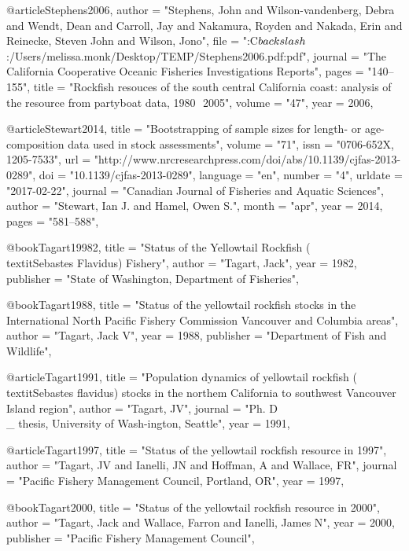 @article{Stephens2006,
    author = "{Stephens, John and Wilson-vandenberg, Debra and Wendt, Dean and Carroll, Jay and Nakamura, Royden and Nakada, Erin and Reinecke, Steven John and Wilson, Jono}",
    file = "{:C$\\backslash$:/Users/melissa.monk/Desktop/TEMP/Stephens2006.pdf:pdf}",
    journal = "{The California Cooperative Oceanic Fisheries Investigations Reports}",
    pages = "{140--155}",
    title = "{{Rockfish resouces of the south central California coast: analysis of the resource from partyboat data, 1980  2005}}",
    volume = "{47}",
    year = 2006,
}

@article{Stewart2014,
    title = "{Bootstrapping of sample sizes for length- or age-composition data used in stock assessments}",
    volume = "{71}",
    issn = "{0706-652X, 1205-7533}",
    url = "{http://www.nrcresearchpress.com/doi/abs/10.1139/cjfas-2013-0289}",
    doi = "{10.1139/cjfas-2013-0289}",
    language = "{en}",
    number = "{4}",
    urldate = "{2017-02-22}",
    journal = "{Canadian Journal of Fisheries and Aquatic Sciences}",
    author = "{Stewart, Ian J. and Hamel, Owen S.}",
    month = "apr",
    year = 2014,
    pages = "{581--588}",
}

@book{Tagart19982,
    title = "{Status of the Yellowtail Rockfish (\\textit{{Sebastes} Flavidus}) Fishery}",
    author = "{Tagart, Jack}",
    year = 1982,
    publisher = "{State of Washington, Department of Fisheries}",
}

@book{Tagart1988,
    title = "{Status of the yellowtail rockfish stocks in the International North Pacific Fishery Commission Vancouver and Columbia areas}",
    author = "{Tagart, Jack V}",
    year = 1988,
    publisher = "{Department of Fish and Wildlife}",
}

@article{Tagart1991,
    title = "{Population dynamics of yellowtail rockfish (\\textit{{Sebastes} flavidus}) stocks in the northem California to southwest Vancouver Island region}",
    author = "{Tagart, JV}",
    journal = "{Ph. D\\_ thesis, University of Wash-ington, Seattle}",
    year = 1991,
}

@article{Tagart1997,
    title = "{Status of the yellowtail rockfish resource in 1997}",
    author = "{Tagart, JV and Ianelli, JN and Hoffman, A and Wallace, FR}",
    journal = "{Pacific Fishery Management Council, Portland, OR}",
    year = 1997,
}

@book{Tagart2000,
    title = "{Status of the yellowtail rockfish resource in 2000}",
    author = "{Tagart, Jack and Wallace, Farron and Ianelli, James N}",
    year = 2000,
    publisher = "{Pacific Fishery Management Council}",
}

